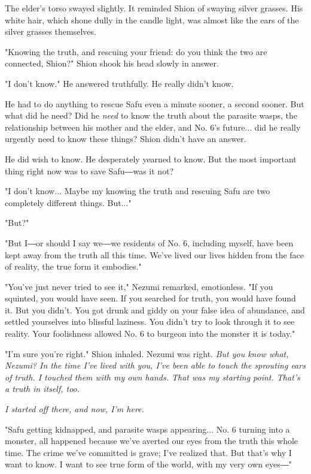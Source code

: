 The elder's torso swayed slightly. It reminded Shion of swaying silver
grasses. His white hair, which shone dully in the candle light, was
almost like the ears of the silver grasses themselves.

"Knowing the truth, and rescuing your friend: do you think the two are
connected, Shion?" Shion shook his head slowly in answer.

"I don't know." He answered truthfully. He really didn't know.

He had to do anything to rescue Safu even a minute sooner, a second
sooner. But what did he need? Did he \emph{need} to know the truth about the
parasite wasps, the relationship between his mother and the elder, and
No. 6's future... did he really urgently need to know these things?
Shion didn't have an answer.

He did wish to know. He desperately yearned to know. But the most
important thing right now was to save Safu―was it not?

"I don't know... Maybe my knowing the truth and rescuing Safu are two
completely different things. But..."

"But?"

"But I―or should I say we―we residents of No. 6, including myself, have
been kept away from the truth all this time. We've lived our lives
hidden from the face of reality, the true form it embodies."

"You've just never tried to see it," Nezumi remarked, emotionless. "If
you squinted, you would have seen. If you searched for truth, you would
have found it. But you didn't. You got drunk and giddy on your false
idea of abundance, and settled yourselves into blissful laziness. You
didn't try to look through it to see reality. Your foolishness allowed
No. 6 to burgeon into the monster it is today."

"I'm sure you're right." Shion inhaled. Nezumi was right. \emph{But you know
what, Nezumi? In the time I've lived with you, I've been able to touch
the sprouting ears of truth. I touched them with my own hands. That was
my starting point. That's a truth in itself, too.}

\emph{I started off there, and now, I'm here.}

"Safu getting kidnapped, and parasite wasps appearing... No. 6 turning
into a monster, all happened because we've averted our eyes from the
truth this whole time. The crime we've committed is grave; I've realized
that. But that's why I want to know. I want to see true form of the
world, with my very own eyes―"

